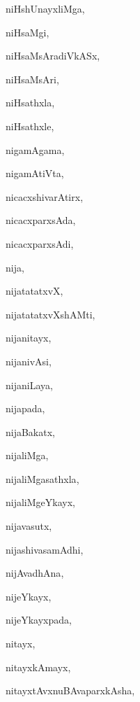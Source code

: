 \begin{multicols}{3}
{\noindent
{niHshUnayxliMga}, \pageref{niHshUnayxliMga}

\noindent
{niHsaMgi}, \pageref{niHsaMgi}

\noindent
{niHsaMsAradiVkASx}, \pageref{niHsaMsAradiVkASx}

\noindent
{niHsaMsAri}, \pageref{niHsaMsAri}

\noindent
{niHsathxla}, \pageref{niHsathxla}

\noindent
{niHsathxle}, \pageref{niHsathxle}

\noindent
{nigamAgama}, \pageref{nigamAgama}

\noindent
{nigamAtiVta}, \pageref{nigamAtiVta}

\noindent
{nicacxshivarAtirx}, \pageref{nicacxshivarAtirx}

\noindent
{nicacxparxsAda}, \pageref{nicacxparxsAda}

\noindent
{nicacxparxsAdi}, \pageref{nicacxparxsAdi}

\noindent
{nija}, \pageref{nija}

\noindent
{nijatatatxvX}, \pageref{nijatatatxvX}

\noindent
{nijatatatxvXshAMti}, \pageref{nijatatatxvXshAMti}

\noindent
{nijanitayx}, \pageref{nijanitayx}

\noindent
{nijanivAsi}, \pageref{nijanivAsi}

\noindent
{nijaniLaya}, \pageref{nijaniLaya}

\noindent
{nijapada}, \pageref{nijapada}

\noindent
{nijaBakatx}, \pageref{nijaBakatx}

\noindent
{nijaliMga}, \pageref{nijaliMga}

\noindent
{nijaliMgasathxla}, \pageref{nijaliMgasathxla}

\noindent
{nijaliMgeYkayx}, \pageref{nijaliMgeYkayx}

\noindent
{nijavasutx}, \pageref{nijavasutx}

\noindent
{nijashivasamAdhi}, \pageref{nijashivasamAdhi}

\noindent
{nijAvadhAna}, \pageref{nijAvadhAna}

\noindent
{nijeYkayx}, \pageref{nijeYkayx}

\noindent
{nijeYkayxpada}, \pageref{nijeYkayxpada}

\noindent
{nitayx}, \pageref{nitayx}

\noindent
{nitayxkAmayx}, \pageref{nitayxkAmayx}

\noindent
{nitayxtAvxnuBAvaparxkAsha}, \pageref{nitayxtAvxnuBAvaparxkAsha}

}
\end{multicols}

